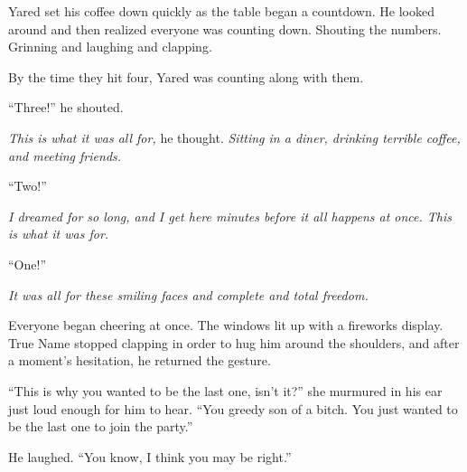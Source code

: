 Yared set his coffee down quickly as the table began a countdown. He looked around and then realized everyone was counting down. Shouting the numbers. Grinning and laughing and clapping.

By the time they hit four, Yared was counting along with them.

``Three!'' he shouted.

\emph{This is what it was all for,} he thought. \emph{Sitting in a diner, drinking terrible coffee, and meeting friends.}

``Two!''

\emph{I dreamed for so long, and I get here minutes before it all happens at once. This is what it was for.}

``One!''

\emph{It was all for these smiling faces and complete and total freedom.}

Everyone began cheering at once. The windows lit up with a fireworks display. True Name stopped clapping in order to hug him around the shoulders, and after a moment's hesitation, he returned the gesture.

``This is why you wanted to be the last one, isn't it?'' she murmured in his ear just loud enough for him to hear. ``You greedy son of a bitch. You just wanted to be the last one to join the party.''

He laughed. ``You know, I think you may be right.''
